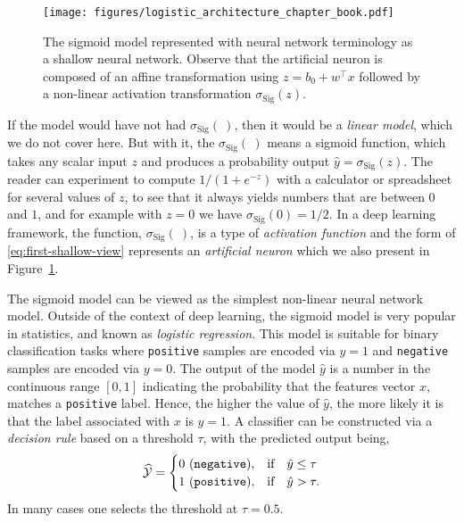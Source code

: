 \begin{figure}[h]
\begin{center}
\texttt{[image: figures/logistic\_architecture\_chapter\_book.pdf]}
\end{center}
\caption{The sigmoid model represented with neural network terminology as a shallow neural network. Observe that the artificial neuron is composed of an affine transformation using $z = b_0 + w^\top x$ followed by a non-linear activation transformation 
$\sigma_{\text{Sig}}(z)$.} %
\label{fig:niceneuron}
\end{figure}

If the model would have not had $\sigma_{\text{Sig}}(~)$, then it would be a {\em linear model}, which we do not cover here. But with it, the $\sigma_{\text{Sig}}(~)$ means a sigmoid function, which takes any scalar input $z$ and produces a probability output $\hat{y}=\sigma_{\text{Sig}}(z)$. The reader can experiment to compute $1/(1+e^{-z})$ with a calculator or spreadsheet for several values of $z$, to see that it always yields numbers that are between $0$ and $1$, and for example with $z=0$ we have $\sigma_{\text{Sig}}(0) = 1/2$. In a deep learning framework, the function, $\sigma_{\text{Sig}}(~)$, is a type of {\em activation function} and the form of \eqref{eq:first-shallow-view} represents an \textit{artificial neuron} which we also present in Figure~\ref{fig:niceneuron}. 


The sigmoid model can be viewed as the simplest non-linear neural network model. %
Outside of the context of deep learning, the sigmoid model is very popular in statistics, and known as {\em logistic regression}. This model is suitable for binary classification tasks where \texttt{positive} samples are encoded via $y=1$ and \texttt{negative} samples are encoded via $y=0$.  The output of the model $\hat{y}$ is a number in the continuous range $[0,1]$ indicating the probability that the features vector $x$, matches a \texttt{positive} label. Hence, the higher the value of $\hat{y}$, the more likely it is that the label associated with $x$ is $y=1$. A classifier can be constructed via a \textit{decision rule} based on a threshold $\tau$, with the predicted output being,
%
\begin{equation} %
\label{eq:y-hat-tau}
\widehat{\cal Y} = 
\begin{cases}
0~ (\texttt{negative}), & \text{if} \quad  \hat{y} \le \tau \\
1~ (\texttt{positive}), & \text{if} \quad   \hat{y} > \tau.
\end{cases}
\end{equation}
In many cases one selects the threshold at $\tau = 0.5$. \\

